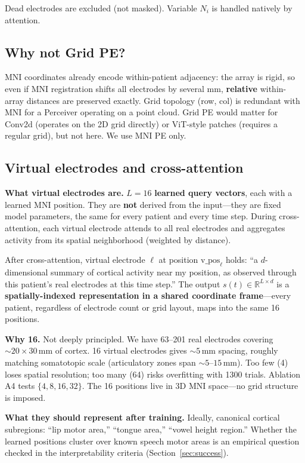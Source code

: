 \documentclass[11pt,letterpaper]{article}
\newcommand{\R}{\mathbb{R}}
\begin{document}
Dead electrodes are excluded (not masked). Variable $N_i$ is handled natively by attention.

\subsection{Why not Grid PE?}

MNI coordinates already encode within-patient adjacency: the array is rigid, so even if MNI registration shifts all electrodes by several mm, \textbf{relative} within-array distances are preserved exactly. Grid topology (row, col) is redundant with MNI for a Perceiver operating on a point cloud. Grid PE would matter for Conv2d (operates on the 2D grid directly) or ViT-style patches (requires a regular grid), but not here. We use MNI PE only.

\subsection{Virtual electrodes and cross-attention}\label{sec:virtual-electrodes}

\textbf{What virtual electrodes are.} $L = 16$ \textbf{learned query vectors}, each with a learned MNI position. They are \textbf{not} derived from the input---they are fixed model parameters, the same for every patient and every time step. During cross-attention, each virtual electrode attends to all real electrodes and aggregates activity from its spatial neighborhood (weighted by distance).

After cross-attention, virtual electrode $\ell$ at position $\text{v\_pos}_\ell$ holds: ``a $d$-dimensional summary of cortical activity near my position, as observed through this patient's real electrodes at this time step.'' The output $s(t) \in \R^{L \times d}$ is a \textbf{spatially-indexed representation in a shared coordinate frame}---every patient, regardless of electrode count or grid layout, maps into the same 16 positions.

\textbf{Why 16.} Not deeply principled. We have 63--201 real electrodes covering ${\sim}20 \times 30$\,mm of cortex. 16 virtual electrodes gives ${\sim}5$\,mm spacing, roughly matching somatotopic scale (articulatory zones span ${\sim}5$--$15$\,mm). Too few (4) loses spatial resolution; too many (64) risks overfitting with 1300 trials. Ablation A4 tests $\{4, 8, 16, 32\}$. The 16 positions live in 3D MNI space---no grid structure is imposed.

\textbf{What they should represent after training.} Ideally, canonical cortical subregions: ``lip motor area,'' ``tongue area,'' ``vowel height region.'' Whether the learned positions cluster over known speech motor areas is an empirical question checked in the interpretability criteria (Section~\ref{sec:success}).
\end{document}

